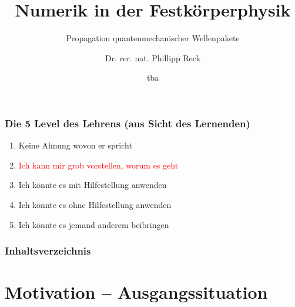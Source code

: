 \documentclass{beamer}
\begin{document}
\title{Numerik in der Festkörperphysik}
\subtitle{Propagation quantenmechanischer Wellenpakete}
\author[Phillipp Reck]{Dr. rer. nat. Phillipp Reck}
\date{tba} 

\begin{frame}
\titlepage\end{frame}

\begin{frame}\frametitle{Die 5 Level des Lehrens (aus Sicht des Lernenden)}
    
\begin{enumerate}
  \item  \glqq Keine Ahnung wovon er spricht\grqq
  \item  \textcolor<2->{red}{\glqq Ich kann mir grob vorstellen, worum es geht\grqq}
  \item  \glqq Ich könnte es mit Hilfestellung anwenden\grqq
  \item  \glqq Ich könnte es ohne Hilfestellung anwenden\grqq
  \item  \glqq Ich könnte es jemand anderem beibringen\grqq
\end{enumerate}

\vfill

\end{frame} 
    

\begin{frame}
\frametitle{Inhaltsverzeichnis}\tableofcontents
\end{frame} 


\section{Motivation -- Ausgangssituation}
\end{document}
